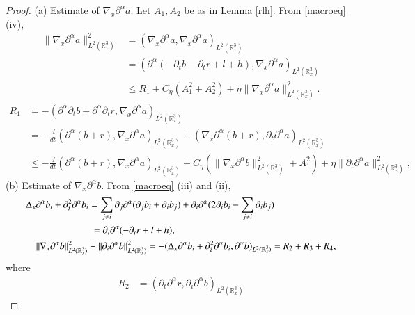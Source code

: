 \documentclass{amsart}[12pt, article]
\begin{document}
\begin{proof}
(a) Estimate of $\nabla_x{{\partial}}^\alpha  a$. Let $A_1,A_2$ be as in Lemma \ref{rlh}.
{}From \eqref{macroeq} (iv),
\begin{align*}
 \|\nabla_x {{\partial}}^\alpha a\|_{L^2({{{\mathbb R}}}^3_x)}^2
&=(\nabla_x {{\partial}}^\alpha a,\nabla_x {{\partial}}^\alpha a)_{L^2({{{\mathbb R}}}^3_x)}
\\&= ({{\partial}}^\alpha (-{{\partial}}_t b-{{\partial}}_tr+l+h),\nabla_x {{\partial}}^\alpha a)_{L^2({{{\mathbb R}}}^3_x)}
\\&\le R_1+C_\eta (A_1^2+A_2^2)+\eta \|\nabla_x {{\partial}}^\alpha a\|_{L^2({{{\mathbb R}}}^3_x)}^2.
\end{align*}
\begin{align*}
R_1&=-({{\partial}}^\alpha {{\partial}}_tb+{{\partial}}^\alpha {{\partial}}_tr,\nabla_x {{\partial}}^\alpha a)_{L^2({{{\mathbb R}}}^3_x)}
\\&=-\frac{d}{dt}({{\partial}}^\alpha (b+r),\nabla_x {{\partial}}^\alpha a)_{L^2({{{\mathbb R}}}^3_x)}+
(\nabla_x{{\partial}}^\alpha (b+r), {{\partial}}_t {{\partial}}^\alpha a)_{L^2({{{\mathbb R}}}^3_x)}
\\&
\le
-\frac{d}{dt}({{\partial}}^\alpha (b+r),\nabla_x {{\partial}}^\alpha a)_{L^2({{{\mathbb R}}}^3_x)}+
C_\eta ( \|\nabla_x{{\partial}}^\alpha  b\|_{L^2({{{\mathbb R}}}^3_x)}^2+A_1^2)
+\eta
\|{{\partial}}_t{{\partial}}^\alpha  a\|^2_{L^2({{{\mathbb R}}}^3_x)},
\end{align*}
(b) Estimate of $\nabla_x{{\partial}}^\alpha  b$. {}From \eqref{macroeq} (iii) and (ii),
\begin{align*}
\Delta_x&{{\partial}}^\alpha b_i+{{\partial}}^2_{i}{{\partial}}^\alpha   b_i=
{\sum_{j \ne i} {{\partial}}_j {{\partial}}^{\alpha}( {{\partial}}_j b_i + {{\partial}}_i b_j)
+ {{\partial}}_i {{\partial}}^\alpha( 2 {{\partial}}_i b_i - \sum_{j\ne i} {{\partial}}_i b_j)
}
\\
&\hskip2cm =
{{\partial}}_i{{\partial}}^\alpha  (-{{\partial}}_t r +l+h),
\\
&\|\nabla_x{{\partial}}^\alpha  b\|_{L^2({{{\mathbb R}}}^3_x)}^2+\|{{\partial}}_i{{\partial}}^\alpha  b\|_{L^2({{{\mathbb R}}}^3_x)}^2=
-(\Delta_x{{\partial}}^\alpha b_i+{{\partial}}^2_{i}{{\partial}}^\alpha   b_i, {{\partial}}^\alpha  b)_{L^2({{{\mathbb R}}}^3_x)}
= R_2+R_3+R_4,
\end{align*}
where
\begin{align*}
R_2&=({{\partial}}_t{{\partial}}^\alpha   r,{{\partial}}_i{{\partial}}^\alpha  b)_{L^2({{{\mathbb R}}}^3_x)}

\end{align*}
\end{proof}
\end{document}
